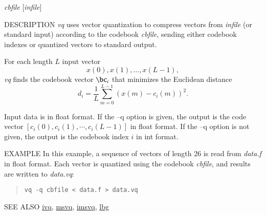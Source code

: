 \begin{synopsis}
\item [vq] [ --l $L$ ] [ --n $N$ ] [ --q ] {\em cbfile} [{\em infile}]
\end{synopsis}

\begin{qsection}{DESCRIPTION}
{\em vq} uses vector quantization to compress vectors 
from {\em infile} (or standard input)
according to the codebook {\em cbfile}, 
sending either codebook indexes or quantized vectors to standard output.

For each length $L$ input vector
\begin{displaymath}
  x(0),x(1),\dots,x(L-1),
\end{displaymath}
{\em vq} finds the codebook vector $\bc_i$ 
that minimizes the Euclidean distance
\begin{displaymath}
d_i = \frac{1}{L}\sum_{m=0}^{L-1} (x(m)-c_i(m))^2. 
\end{displaymath}

Input data is in float format.
If the --q option is given, 
the output is the code vector $[c_i(0), c_i(1), \cdots, c_i(L-1)]$ 
in float format.
If the --q option is not given, 
the output is the codebook index $i$ in int format.
\end{qsection}

\begin{options}
\end{options}

\begin{qsection}{EXAMPLE}
In this example, a sequence of vectors of length 26 is read from
{\em data.f} in float format.
Each vector is quantized using the codebook {\em cbfile},
and results are written to {\em data.vq}:
\begin{quote}
 \verb!vq -q cbfile < data.f > data.vq!
\end{quote} 
\end{qsection}

\begin{qsection}{SEE ALSO}
\hyperlink{ivq}{ivq},
\hyperlink{msvq}{msvq},
\hyperlink{imsvq}{imsvq},
\hyperlink{lbg}{lbg}
\end{qsection}
